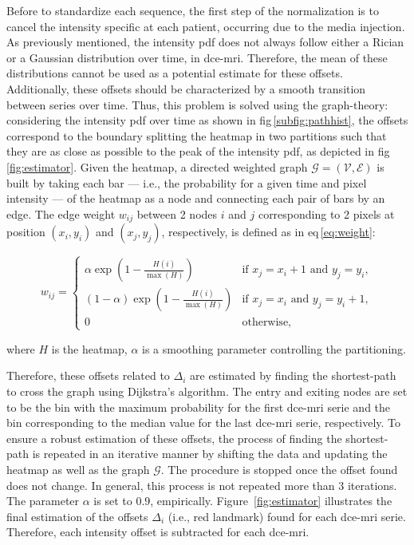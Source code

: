 Before to standardize each sequence, the first step of the normalization is to cancel the intensity specific at each patient, occurring due to the media injection.
As previously mentioned, the intensity \ac{pdf} does not always follow either a Rician or a Gaussian distribution over time, in \ac{dce}-\ac{mri}.
Therefore, the mean of these distributions cannot be used as a potential estimate for these offsets.
Additionally, these offsets should be characterized by a smooth transition between series over time.
Thus, this problem is solved using the graph-theory: considering the intensity \ac{pdf} over time as shown in \acs{fig}\,\ref{subfig:pathhist}, the offsets correspond to the boundary splitting the heatmap in two partitions such that they are as close as possible to the peak of the intensity \ac{pdf}, as depicted in \acs{fig}\,\ref{fig:estimator}.
Given the heatmap, a directed weighted graph $\mathcal{G}=(\mathcal{V}, \mathcal{E})$ is built by taking each bar --- i.e., the probability for a given time and pixel intensity --- of the heatmap as a node and connecting each pair of bars by an edge.
The edge weight $w_{ij}$ between 2 nodes $i$ and $j$ corresponding to 2 pixels at position $(x_i, y_i)$ and $(x_j, y_j)$, respectively, is defined as in \acs{eq}\,\eqref{eq:weight}:

\begin{equation}
  w_{ij} = \begin{cases}
    \alpha \exp(1 - \frac{H(i)}{\max(H)})       & \text{if } x_j = x_i + 1 \text{ and } y_j = y_i, \\
    (1 - \alpha) \exp(1 - \frac{H(i)}{\max(H)}) & \text{if } x_j = x_i \text{ and } y_j = y_i + 1, \\
    0                                           & \text{otherwise},
  \end{cases}
  \label{eq:weight}
\end{equation}

\noindent where $H$ is the heatmap, $\alpha$ is a smoothing parameter controlling the partitioning.

Therefore, these offsets related to $\Delta_i$ are estimated by finding the shortest-path to cross the graph using Dijkstra's algorithm.
The entry and exiting nodes are set to be the bin with the maximum probability for the first \ac{dce}-\ac{mri} serie and the bin corresponding to the median value for the last \ac{dce}-\ac{mri} serie, respectively.
To ensure a robust estimation of these offsets, the process of finding the shortest-path is repeated in an iterative manner by shifting the data and updating the heatmap as well as the graph $\mathcal{G}$.
The procedure is stopped once the offset found does not change.
In general, this process is not repeated more than 3 iterations.
The parameter $\alpha$ is set to $0.9$, empirically.
Figure~\ref{fig:estimator} illustrates the final estimation of the offsets $\Delta_i$ (i.e., red landmark) found for each \ac{dce}-\ac{mri} serie.
Therefore, each intensity offset is subtracted for each \ac{dce}-\ac{mri}.

